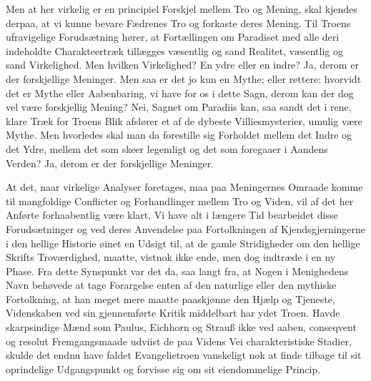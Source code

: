 \documentclass[12pt]{book}
\newcommand{\opage}[1]{\marginnote{\footnotesize\textit{[#1]}}}
\begin{document}
Men at her virkelig er en principiel Forskjel mellem
Tro og Mening, skal kjendes derpaa, at vi kunne bevare
Fædrenes Tro og forkaste deres Mening. Til Troens ufravigelige
Forudsætning hører, at Fortællingen om Paradiset
med alle deri indeholdte Charakteertræk tillægges væsentlig og
sand Realitet, væsentlig og sand Virkelighed. Men hvilken
Virkelighed? En ydre eller en indre? Ja, derom er der
forskjellige Meninger. Men saa er det jo kun en Mythe;
eller rettere: hvorvidt det er Mythe eller Aabenbaring, vi
have for os i dette Sagn, derom kan der dog vel være forskjellig
Mening? Nei, Sagnet om Paradiis kan, saa sandt
det i rene, klare Træk for Troens Blik afslører et af de
dybeste Villiesmysterier, umulig være Mythe. Men hvorledes
skal man da forestille sig Forholdet mellem det Indre
\opage{64}\setcounter{footnote}{0}%
og det Ydre, mellem det som skeer legemligt og det som foregaaer
i Aandens Verden? Ja, derom er der forskjellige
Meninger.

At det, naar virkelige Analyser foretages, maa paa Meningernes
Omraade komme til mangfoldige Conflicter og
Forhandlinger mellem Tro og Viden, vil af det her Anførte
forhaabentlig være klart. Vi have alt i længere Tid bearbeidet
disse Forudsætninger og ved deres Anvendelse paa
Fortolkningen af Kjendsgjerningerne i den hellige Historie
øinet en Udsigt til, at de gamle Stridigheder om den hellige
Skrifts Troværdighed, maatte, vistnok ikke ende, men dog
indtræde i en ny Phase. Fra dette Synspunkt var det da,
saa langt fra, at Nogen i Menighedens Navn behøvede at
tage Forargelse enten af den naturlige eller den mythiske
Fortolkning, at han meget mere maatte paaskjønne den Hjælp
og Tjeneste, Videnskaben ved sin gjennemførte Kritik middelbart
har ydet Troen. Havde skarpsindige Mænd som Paulus,
Eichhorn og Strauß ikke ved aaben, conseqvent og resolut
Fremgangsmaade udviist de paa Videns Vei charakteristiske
Stadier, skulde det endnu have faldet Evangelietroen vanskeligt
nok at finde tilbage til sit oprindelige Udgangspunkt og
forvisse sig om sit eiendommelige Princip.
\end{document}
